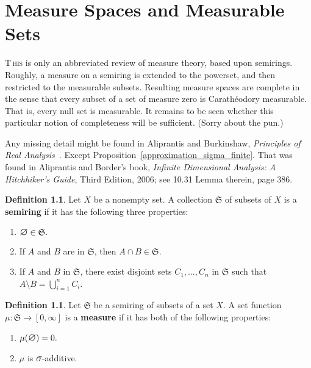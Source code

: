 \documentclass[
twoside=true,
paper=letter,
fontsize=11pt,
pagesize=auto,
leqno,
openany,
headsepline,
overfullrule,
]{scrbook}
\theoremstyle{plain}
\theoremstyle{plain}
\theoremstyle{definition}
\newtheorem{defn}[thm]{Definition}
\theoremstyle{bfnoteitalic}
\theoremstyle{bfnoteroman}
\newcommand{\term}[1]{\textbf{#1}\index{#1}}
\newcommand{\sigalg}[1]{\mathfrak{#1}}
\newcommand{\textsigma}{\hbox{\large{$\sigma$}}\kern-1pt}
\newcommand{\mtset}{\hbox{\large{$\varnothing$}}}
\newcommand{\meets}{\cap}
\newcommand{\semiring}{\sigalg{S}}
\newcommand{\measurespace}{X}
\newcommand{\measure}{\mu}
\begin{document}
\chapter{Measure Spaces and Measurable Sets}
\lettrine{T}{\,his} is only an abbreviated review of measure theory, based upon semirings.
Roughly, a measure on a semiring is extended to the powerset, and then restricted to the measurable subsets.  Resulting measure spaces are complete in the sense that every subset of a set of measure zero is 
Carath\'{e}odory measurable. That is, every null set is measurable.
It remains to be seen whether this particular notion of completeness will be sufficient.
(Sorry about the pun.)

Any missing detail might be found in  Aliprantis and Burkinshaw, \textsl{Principles of Real Analysis}~\cite{pora_aliprantis_1990}. Except Proposition~\ref{approximation_sigma_finite}. That was found in Aliprantis and Border's book, \textsl{Infinite Dimensional Analysis: A Hitchhiker's Guide}, Third Edition, 2006; see 10.31 Lemma therein, page 386.

\begin{defn}
Let $\measurespace$ be a nonempty set.  A collection $\semiring$ of subsets of $\measurespace$ is a \textbf{semiring} if it has the following three properties:
\begin{enumerate} %
\item $\mtset\in\semiring.$
\item If $A$ and $B$ are in $\semiring$, then $A\meets B\in\semiring$. 
\item If  $A$ and $B$ in $\semiring$, there exist disjoint sets $C_1, \ldots , C_n$ in $\semiring$ such that $A\setminus B =\bigcup_{i=1}^{n}C_i$.
\end{enumerate}
\end{defn}

 
\begin{defn}
Let $\semiring$ be a semiring of subsets of a set $\measurespace$. A set function $\measure:\semiring\to [0,\infty]$ is a \term{measure} if it has both of the following properties:
\begin{enumerate}
\item $\measure(\mtset) = 0.$
\item $\measure$ is $\textsigma$-additive.
\end{enumerate} 
\end{defn} 
\end{document}
